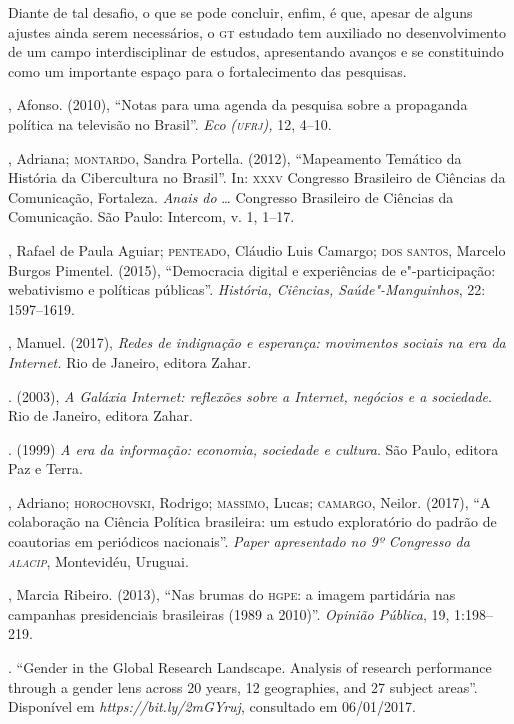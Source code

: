Diante de tal desafio, o que se pode concluir, enfim, é que, apesar de
alguns ajustes ainda serem necessários, o \textsc{gt} estudado tem auxiliado no
desenvolvimento de um campo interdisciplinar de estudos, apresentando
avanços e se constituindo como um importante espaço para o
fortalecimento das pesquisas.

\begin{bibliohedra}
, Afonso. (2010), ``Notas para uma agenda da pesquisa sobre a
propaganda política na televisão no Brasil''. \emph{Eco} \emph{(\textsc{ufrj}),}
12, 4--10.

, Adriana; \textsc{montardo}, Sandra Portella. (2012), ``Mapeamento
Temático da História da Cibercultura no Brasil''. In: \textsc{xxxv} Congresso
Brasileiro de Ciências da Comunicação, Fortaleza. \emph{Anais do} \ldots{}
Congresso Brasileiro de Ciências da Comunicação. São Paulo: Intercom, v.
1, 1--17.

, Rafael de Paula Aguiar; \textsc{penteado}, Cláudio Luis Camargo; \textsc{dos
santos}, Marcelo Burgos Pimentel. (2015), ``Democracia digital e
experiências de e"-participação: webativismo e políticas públicas''.
\emph{História, Ciências, Saúde"-Manguinhos}, 22: 1597--1619.

, Manuel. (2017), \emph{Redes de indignação e esperança:
movimentos sociais na era da Internet.} Rio de Janeiro, editora Zahar.

\titidem. (2003), \emph{A Galáxia Internet: reflexões sobre a
Internet, negócios e a sociedade}. Rio de Janeiro, editora Zahar.

\titidem. (1999) \emph{A era da informação: economia, sociedade
e cultura}. São Paulo, editora Paz e Terra.

, Adriano; \textsc{horochovski}, Rodrigo; \textsc{massimo}, Lucas; \textsc{camargo}, Neilor.
(2017), ``A colaboração na Ciência Política brasileira: um estudo
exploratório do padrão de coautorias em periódicos nacionais''.
\emph{Paper apresentado no 9º Congresso da \textsc{alacip}}, Montevidéu,
Uruguai.

, Marcia Ribeiro. (2013), ``Nas brumas do \textsc{hgpe}: a imagem partidária
nas campanhas presidenciais brasileiras (1989 a 2010)''. \emph{Opinião
Pública}, 19, 1:198--219.

. ``Gender in the Global Research Landscape. Analysis of
research performance through a gender lens across 20 years, 12
geographies, and 27 subject areas''. Disponível em
\emph{https://bit.ly/2mGYruj}, consultado em 06/01/2017.


\end{bibliohedra}
